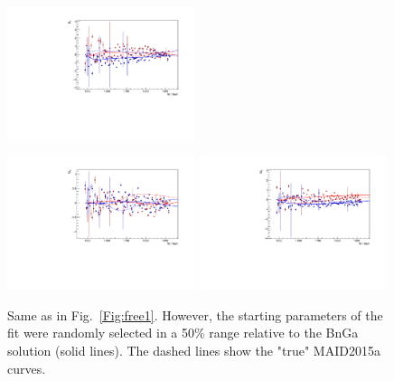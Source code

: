\documentclass[a4paper,12pt]{report}
\begin{document}
\begin{figure}
\begin{center}
{    \includegraphics[width=0.49\textwidth]{BnGa/free/plots.0/E2m.pdf}
    }
    \centerline{
    \includegraphics[width=0.49\textwidth]{BnGa/free/plots.0/M2p.pdf}
    \includegraphics[width=0.49\textwidth]{BnGa/free/plots.0/M2m.pdf}
    }
    \caption{Same as in Fig.~\ref{Fig:free1}. However, the starting parameters of the fit were randomly selected 
    in a 50\% range relative to the BnGa solution (solid lines). The dashed lines show the "true" MAID2015a curves.}
\label{Fig:free2}
  \end{center}
\end{figure}
\end{document}
